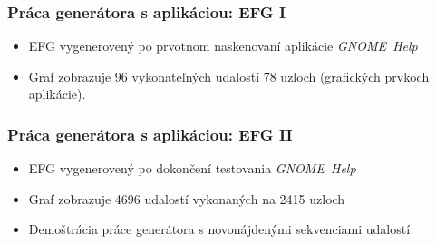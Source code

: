 \documentclass[10pt,xcolor=pdflatex,hyperref={unicode}]{beamer}
\begin{document}
\begin{frame}[fragile]\frametitle{Práca generátora s aplikáciou: EFG I}
\begin{itemize}
    \item EFG vygenerovený po prvotnom naskenovaní aplikácie \textit{GNOME~Help}
    \item Graf zobrazuje 96 vykonateľných udalostí 78 uzloch (grafických prvkoch aplikácie).
\end{itemize}
\begin{figure}[h]
 \end{figure}

\end{frame}

\begin{frame}[fragile]\frametitle{Práca generátora s aplikáciou: EFG II}

\begin{itemize}
    \item EFG vygenerovený po dokončení testovania \textit{GNOME~Help}
    \item Graf zobrazuje 4696 udalostí vykonaných na 2415 uzloch
    \item Demoštrácia práce generátora s novonájdenými sekvenciami udalostí 
\end{itemize}

\begin{figure}[h]
\end{figure}
\end{frame}
\end{document}
